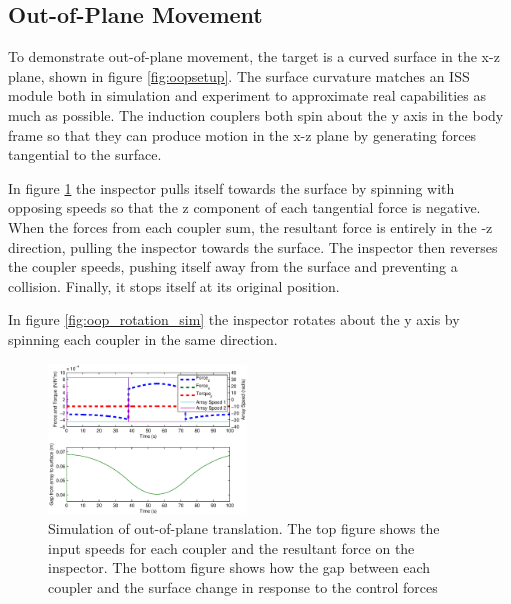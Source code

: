 \documentclass[letterpaper, 10 pt, conference]{ieeeconf}  %
\begin{document}
\subsection{Out-of-Plane Movement}\label{sec:oop_movement_sim}
\par To demonstrate out-of-plane movement, the target is a curved surface in the x-z plane, shown in figure \ref{fig:oopsetup}. The surface curvature matches an ISS module both in simulation and experiment to approximate real capabilities as much as possible. The induction couplers both spin about the y axis in the body frame so that they can produce motion in the x-z plane by generating forces tangential to the surface.   

\par In figure \ref{fig:oop_translation_sim} the inspector pulls itself towards the surface by spinning with opposing speeds so that the z component of each tangential force is negative. When the forces from each coupler sum, the resultant force is entirely in the -z direction, pulling the inspector towards the surface. The inspector then reverses the coupler speeds, pushing itself away from the surface and preventing a collision. Finally, it stops itself at its original position.

\par In figure \ref{fig:oop_rotation_sim} the inspector rotates about the y axis by spinning each coupler in the same direction.



     \begin{figure}[thpb]
      \centering
      \includegraphics[width = 0.47\textwidth]{figures/oop_translation_sim.eps}
      \caption{Simulation of out-of-plane translation. The top figure shows the input speeds for each coupler and the resultant force on the inspector. The bottom figure shows how the gap between each coupler and the surface change in response to the control forces}
      \label{fig:oop_translation_sim}
   \end{figure}
   
\end{document}
